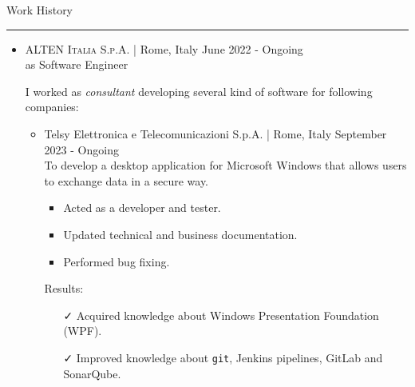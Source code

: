 \documentclass[english,10pt,a4paper]{article}
\newcommand{\SubCompanyName}[1]{\textcolor{CvIcon}{{\footnotesize \textsf{#1}}}}
\newcommand{\CompanyName}[1]{\textsc{{\small #1}}}
\newcommand{\JobTimeRange}[1]{{\footnotesize \textcolor{CvColor!50}{\faCalendar*} \hspace{0.01cm} #1}}
\newcommand{\CvCheck}{\textcolor{CvColor}{\faCheck}}
\newcommand{\CvSection}[2]{
	\hspace{0.25cm}\textcolor{CvColor!50}{#1} \hspace{0.01cm} \textcolor{CvColor!80}{#2}\\
	\textcolor{CvColor}{\rule[.7\baselineskip]{\textwidth}{1pt}}}
\begin{document}
\begin{paracol}{2}
\begin{tcolorbox}[colback=CvSidebarBackColor,height=\textheight,boxrule=0pt, left=0pt,right=0pt,top=0pt,bottom=0pt, arc=0pt,outer arc=0pt, colframe=CvSidebarBackColor]
	
		
	
	
		
\end{tcolorbox}
\switchcolumn
\begin{tcolorbox}[colback=white, height=\textheight, colframe=white, left=0cm]

		
		\vspace{0.3cm}	
		\CvSection{\faBriefcase}{Work History}
	
	\begin{itemize}		
		\item \CompanyName{ALTEN Italia S.p.A.} \textcolor{CvColor}{|} {\scriptsize Rome, Italy} \hfill \JobTimeRange{June 2022 - Ongoing} \\
		{\scriptsize \textcolor{CvIcon}{as} \textcolor{CvColor}{Software Engineer}} 
		\vspace{0.25cm}
		
			{
				\footnotesize I worked as \textit{consultant} developing several kind of software for following companies:
				\begin{itemize}
					
					\item \SubCompanyName{Telsy Elettronica e Telecomunicazioni S.p.A.} \textcolor{CvColor}{|} {\scriptsize Rome, Italy} \hfill \JobTimeRange{September 2023 - Ongoing}\\			
					
					To develop a desktop application for Microsoft Windows that allows users to exchange data in a secure way.
					
					\begin{itemize}
						\item Acted as a developer and tester.
						\item Updated technical and business documentation.
						\item Performed bug fixing.
					\end{itemize}
					
					\textcolor{CvColor}{Results:}
					\begin{itemize}
						\item[\CvCheck] Acquired knowledge about Windows Presentation Foundation (WPF).
						\item[\CvCheck] Improved knowledge about \texttt{git}, Jenkins pipelines, GitLab and SonarQube.
					\end{itemize}
					

\end{itemize}}
\end{itemize}
\end{tcolorbox}
\end{paracol}
\end{document}
